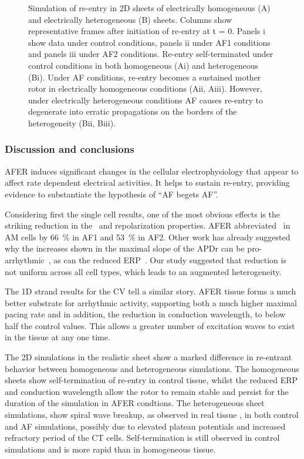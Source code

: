 \begin{figure}[t]
\centering
\caption{Simulation of re-entry in 2D sheets of electrically homogeneous
(A) and electrically heterogeneous (B) sheets.  Columns show
representative frames after initiation of re-entry at t = 0.  Panels i
show data under control conditions, panels ii under AF1 conditions and
panels iii under AF2 conditions.  Re-entry self-terminated under control
conditions in both homogeneous (Ai) and heterogeneous (Bi).  Under AF
conditions, re-entry becomes a sustained mother rotor in
electrically homogeneous conditions (Aii, Aiii).  However, under
electrically heterogeneous conditions AF causes re-entry to degenerate
into erratic propagations on the borders of the heterogeneity (Bii,
Biii).}
\label{fig:plots}
\end{figure}

\subsubsection{Discussion and conclusions}

AFER induces significant changes in the cellular electrophysiology that
appear to affect rate dependent electrical activities.  It helps to
sustain re-entry, providing evidence to substantiate the hypothesis of
``AF begets AF''.

Considering first the single cell results, one of the most obvious
effects is the striking reduction in the \apd\ and repolarization
properties.  AFER abbreviated \apd\ in AM cells by 66~\% in AF1 and
53~\% in AF2.  Other work has already suggested why the increases shown
in the maximal slope of the APDr can be
pro-arrhythmic~\cite{ByungSoo2002}, as can the reduced
ERP~\cite{Xie2002}.  Our study suggested that reduction is not uniform
across all cell types, which leads to an augmented heterogeneity.

The 1D strand results for the CV tell a similar story.  AFER tissue
forms a much better substrate for arrhythmic activity, supporting both a
much higher maximal pacing rate and in addition, the reduction in
conduction wavelength, to below half the control values. This allows a
greater number of excitation waves to exist in the tissue at any one
time.

The 2D simulations in the realistic sheet show a marked difference in
re-entrant behavior between homogeneous and heterogeneous simulations.
The homogeneous sheets show self-termination of re-entry in control
tissue, whilst the reduced ERP and conduction wavelength allow the rotor
to remain stable and persist for the duration of the simulation in AFER
condtions.  The heterogeneous sheet simulations, show spiral wave
breakup, as observed in real tissue \cite{Kumagai1997}, in both control
and AF simulations, possibly due to elevated plateau potentials and
increased refractory period of the CT cells.  Self-termination is still
observed in control simulations and is more rapid than in homogeneous
tissue.

